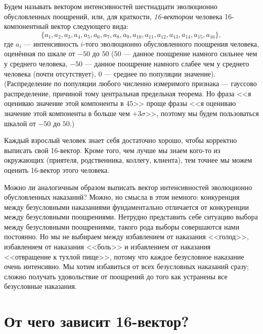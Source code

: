 \documentclass[11pt]{article}
\theoremstyle{remark}
\theoremstyle{definition}
\begin{document}


Будем называть вектором интенсивностей шестнадцати эволюционно обусловленных поощрений, или, для краткости, \textit{16-вектором} человека 16-компонентный вектор следующего вида: $$\{ a_1, a_2, a_3, a_4, a_5, a_6, a_7, a_8, a_9, a_{10}, a_{11}, a_{12}, a_{13}, a_{14}, a_{15}, a_{16} \},$$ где $a_i$ --- интенсивность $i$-того эволюционно обусловленного поощрения человека, оценённая по шкале от $-50$ до $50$ ($50$ --- данное поощрение намного сильнее чем у среднего человека, $-50$ --- данное поощрение намного слабее чем у среднего человека (почти отсутствует), $0$ --- среднее по популяции значение). (Распределение по популяции любого численно измеримого признака --- гауссово распределение, причиной тому центральная предельная теорема. Но фраза <<я оцениваю значение этой компоненты в $45$>> проще фразы <<я оцениваю значение этой компоненты в больше чем $+3\sigma$>>, поэтому мы будем пользоваться шкалой от $-50$ до $50$.)





Каждый взрослый человек знает себя достаточно хорошо, чтобы корректно выписать свой 16-вектор. Кроме того, чем лучше мы знаем кого-то из окружающих (приятеля, родственника, коллегу, клиента), тем точнее мы можем оценить 16-вектор этого человека.




Можно ли аналогичным образом выписать вектор интенсивностей эволюционно обусловленных наказаний? Можно, но смысла в этом немного: конкуренция между безусловными наказаниями фундаментально отличается от конкуренции между безусловными поощрениями. Нетрудно представить себе ситуацию выбора между безусловными поощрениями, такого рода выборы совершаются нами постоянно. Но мы не выбираем между избавлением от наказания <<голод>>, избавлением от наказания <<боль>> и избавлением от наказания <<отвращение к тухлой пище>>, потому что каждое безусловное наказание очень интенсивно. Мы хотим избавиться от всех безусловных наказаний сразу; сложно получать удовольствие от поощрений до того как устранены все безусловные наказания.




\section{От чего зависит 16-вектор?}
\end{document}
